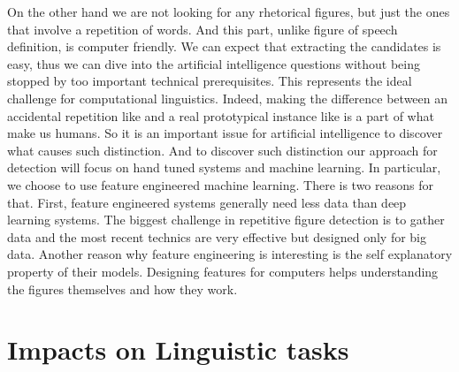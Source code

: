 On the other hand we are not looking for any rhetorical figures, but just the ones that involve a repetition of words. And this part, unlike figure of speech definition, is computer friendly. We can expect that extracting the candidates is easy, thus we can dive into the artificial intelligence questions without being stopped by too important technical prerequisites.
This represents the ideal challenge for computational linguistics. Indeed, making the difference between an accidental repetition like  and a real prototypical instance like  is a part of what make us humans.  
%
%
So it is an important issue for artificial intelligence to discover what causes such distinction. %
And to discover such distinction our approach for detection will focus on hand tuned systems and machine learning. In particular, we choose to use feature engineered machine learning. There is two reasons for that. First, feature engineered systems generally need less data than deep learning systems. The biggest challenge in repetitive figure detection is to gather data and the most recent technics are very effective but designed only for big data.
Another reason why feature engineering is interesting is the self explanatory property of their models. Designing features for computers helps understanding the figures themselves and how they work.


\section{Impacts on Linguistic tasks}

